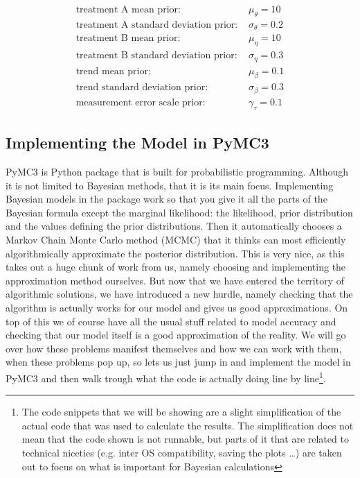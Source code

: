 \documentclass[12pt,a4paper,leqno]{report}
\theoremstyle{plain}
\theoremstyle{definition}
\theoremstyle{remark}
\begin{document}
\begin{align}\label{singlepatientpriorparameters}
    \text{treatment A mean prior: } & \mu_{\theta} = 10 \\
    \text{treatment A standard deviation prior: } & \sigma_{\theta} = 0.2 \nonumber \\
    \text{treatment B mean prior: } & \mu_{\eta} = 10 \nonumber \\
    \text{treatment B standard deviation prior: } & \sigma_{\eta} = 0.3 \nonumber \\
    \text{trend mean prior: } & \mu_{\beta} = 0.1 \nonumber \\
    \text{trend standard deviation prior: } & \sigma_{\beta} = 0.3 \nonumber \\
    \text{measurement error scale prior: } & \gamma_{\tau} = 0.1 \nonumber
\end{align}


\subsection{Implementing the Model in PyMC3}

PyMC3 is Python package that is built for probabilistic programming. Although it is not
limited to Bayesian methods, that it is its main focus. Implementing Bayesian models in
the package work so that you give it all the parts of the Bayesian formula except the
marginal likelihood: the likelihood, prior
distribution and the values defining the prior distributions. Then it automatically
chooses a Markov Chain Monte Carlo method (MCMC) that it thinks can most efficiently
algorithmically approximate the posterior distribution. This is very nice, as this takes out a
huge chunk of work from us, namely choosing and implementing the approximation method
ourselves. But now that we have entered the territory of algorithmic solutions, we have
introduced a new hurdle, namely checking that the algorithm is actually works for our
model and gives us good approximations. On top of this we of course have all the
usual stuff related to model accuracy and checking that our model itself is a good
approximation of the reality. We will go over how these problems manifest themselves and
how we can work with them, when these problems pop up, so lets us just jump in and
implement the model in PyMC3 and then walk trough what the code is
actually doing line by line\footnote{The code snippets that we will be showing are a
slight simplification of the actual code that was used to calculate the results. The simplification does not mean
that the code shown is not runnable, but parts of it that are related to technical niceties
(e.g. inter OS compatibility, saving the plots \ldots) are taken out to focus on what is
important for Bayesian calculations}.
\end{document}
